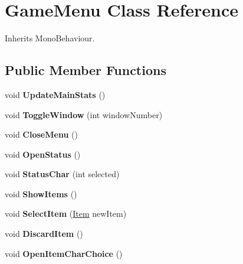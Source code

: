 \hypertarget{class_game_menu}{}\section{Game\+Menu Class Reference}
\label{class_game_menu}


Inherits Mono\+Behaviour.

\subsection*{Public Member Functions}
\begin{DoxyCompactItemize}
\item 
\mbox{\label{class_game_menu_a3c94ffb8b6646f83066f110d839a9dfd}} 
void {\bfseries Update\+Main\+Stats} ()
\item 
\mbox{\label{class_game_menu_a5890fb0521ec086040834c266a7f2437}} 
void {\bfseries Toggle\+Window} (int window\+Number)
\item 
\mbox{\label{class_game_menu_a3a5de21880832f52aa9830ac4bd07572}} 
void {\bfseries Close\+Menu} ()
\item 
\mbox{\label{class_game_menu_a6dd9ccacc5362fab852ec11223629ff0}} 
void {\bfseries Open\+Status} ()
\item 
\mbox{\label{class_game_menu_a7acaef9e2dcc7626de5ec442fff07da9}} 
void {\bfseries Status\+Char} (int selected)
\item 
\mbox{\label{class_game_menu_a239d036990a6854f9c9aa970e3020740}} 
void {\bfseries Show\+Items} ()
\item 
\mbox{\label{class_game_menu_ae488d7b8c75f89b2fdcf66aa7e05b87e}} 
void {\bfseries Select\+Item} (\mbox{\hyperlink{class_item}{Item}} new\+Item)
\item 
\mbox{\label{class_game_menu_a649f790e833200d60eba5b1788f2c85e}} 
void {\bfseries Discard\+Item} ()
\item 
\mbox{\label{class_game_menu_ad2a2041e1e4b5f675de1e231a672a26a}} 
void {\bfseries Open\+Item\+Char\+Choice} ()

\end{DoxyCompactItemize}

